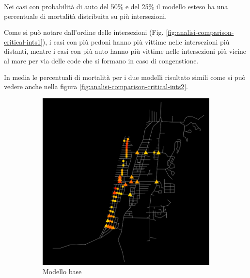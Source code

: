 Nei casi con probabilità di auto del 50\% e del 25\% il modello esteso ha una percentuale di mortalità distribuita su più intersezioni.

Come si può notare dall'ordine delle intersezioni (Fig. \ref{fig:analisi-comparison-critical-ints1}), i casi con più pedoni
hanno più vittime nelle intersezioni più distanti, mentre i casi con più auto hanno più vittime nelle intersezioni più vicine al mare per
via delle code che si formano in caso di congenstione.

In media le percentuali di mortalità per i due modelli risultato simili come si può vedere anche nella figura \ref{fig:analisi-comparison-critical-ints2}.


\begin{figure}[ht]
    \centering
    \begin{subfigure}{0.475\textwidth}
        \includegraphics[width=\textwidth]{images/analisi/base_critical_ints_map.png}
        \caption{Modello base}
    \end{subfigure}
    \hfill
    \begin{subfigure}{0.475\textwidth}

\end{subfigure}
\end{figure}
